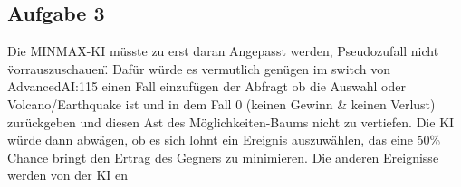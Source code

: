 \documentclass[a4paper]{article}
\begin{document}
	\subsection*{Aufgabe 3}
	Die MINMAX-KI müsste zu erst daran Angepasst werden, Pseudozufall nicht \"vorrauszuschauen\". Dafür würde es vermutlich genügen im switch von AdvancedAI:115 einen Fall einzufügen der Abfragt ob die Auswahl oder Volcano/Earthquake ist und in dem Fall 0 (keinen Gewinn & keinen Verlust) zurückgeben und diesen Ast des Möglichkeiten-Baums nicht zu vertiefen. Die KI würde dann abwägen, ob es sich lohnt ein Ereignis auszuwählen, das eine 50\% Chance bringt den Ertrag des Gegners zu minimieren. Die anderen Ereignisse werden von der KI en
\end{document}
